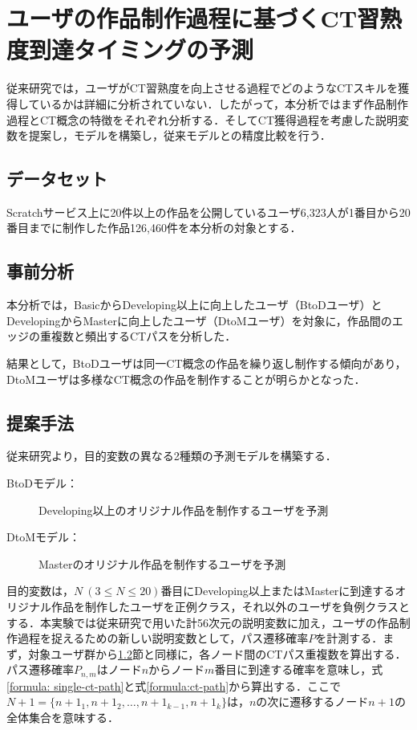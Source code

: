 \documentclass[twocolumn]{jarticle} %
\begin{document}
\section{ユーザの作品制作過程に基づくCT習熟度到達タイミングの予測}

従来研究では，ユーザがCT習熟度を向上させる過程でどのようなCTスキルを獲得しているかは詳細に分析されていない．したがって，本分析ではまず作品制作過程とCT概念の特徴をそれぞれ分析する．そしてCT獲得過程を考慮した説明変数を提案し，モデルを構築し，従来モデルとの精度比較を行う．

\subsection{データセット}

Scratchサービス上に20件以上の作品を公開しているユーザ6,323人が1番目から20番目までに制作した作品126,460件を本分析の対象とする．

\subsection{事前分析}\label{sec:before-analyze}

本分析では，BasicからDeveloping以上に向上したユーザ（BtoDユーザ）とDevelopingからMasterに向上したユーザ（DtoMユーザ）を対象に，作品間のエッジの重複数と頻出するCTパスを分析した．

結果として，BtoDユーザは同一CT概念の作品を繰り返し制作する傾向があり，DtoMユーザは多様なCT概念の作品を制作することが明らかとなった．

\subsection{提案手法}

従来研究より，目的変数の異なる2種類の予測モデルを構築する．

\begin{description}
\item [BtoDモデル：]Developing以上のオリジナル作品を制作するユーザを予測
\item [DtoMモデル：]Masterのオリジナル作品を制作するユーザを予測
\end{description}

目的変数は，{$N~(3 \leq N \leq 20)$}番目にDeveloping以上またはMasterに到達するオリジナル作品を制作したユーザを正例クラス，それ以外のユーザを負例クラスとする．本実験では従来研究で用いた計56次元の説明変数に加え，ユーザの作品制作過程を捉えるための新しい説明変数として，パス遷移確率$P$を計測する．まず，対象ユーザ群から\ref{sec:before-analyze}節と同様に，各ノード間のCTパス重複数を算出する．
パス遷移確率$P_{n,m}$はノード$n$からノード$m$番目に到達する確率を意味し，式\ref{formula: single-ct-path}と式\ref{formula:ct-path}から算出する．ここで$N+1=\{ {n + 1}_1, {n + 1}_2,\ldots,{n + 1}_{k-1}, {n + 1}_k  \}$は，$n$の次に遷移するノード$n+1$の全体集合を意味する．
\end{document}

